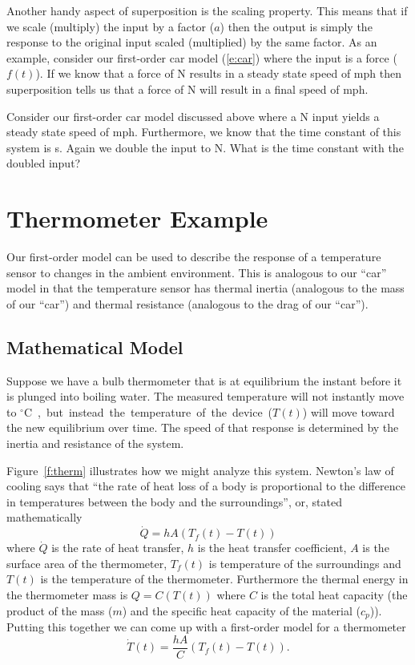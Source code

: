 Another handy aspect of superposition is the scaling property.  This means that if we scale (multiply) the input by a factor ($a$) then the output is simply the response to the original input scaled (multiplied) by the same factor.  As an example, consider our first-order car model (\ref{e:car}) where the input is a force ($f(t)$).  If we know that a force of \unit[1,000]{N} results in a steady state speed of \unit[25]{mph} then superposition tells us that a force of \unit[2,000]{N} will result in a final speed of \unit[50]{mph}.

\begin{ex}
Consider our first-order car model discussed above where a \unit[1,000]{N} input yields a steady state speed of \unit[25]{mph}.  Furthermore, we know that the time constant of this system is \unit[2]{s}.  Again we double the input to \unit[2,000]{N}. What is the time constant with the doubled input?
\end{ex}

\section{Thermometer Example}
Our first-order model can be used to describe the response of a temperature sensor to changes in the ambient environment.  This is analogous to our ``car'' model in that the temperature sensor has thermal inertia (analogous to the mass of our ``car'') and thermal resistance (analogous to the drag of our ``car'').  

\subsection{Mathematical Model}
Suppose we have a bulb thermometer that is at equilibrium the instant before it is plunged into boiling water.  The measured temperature will not instantly move to \unit[100]{$^{\circ}$C}, but instead the temperature of the device ($T(t)$) will move toward the new equilibrium over time.  The speed of that response is determined by the inertia and resistance of the system.

Figure~\ref{f:therm} illustrates how we might analyze this system.  Newton's law of cooling says that ``the rate of heat loss of a body is proportional to the difference in temperatures between the body and the surroundings'', or, stated mathematically 
\begin{equation}
\dot{Q}=hA (T_f(t)-T(t))
\end{equation}
where $\dot{Q}$ is the rate of heat transfer, $h$ is the heat transfer coefficient, $A$ is the surface area of the thermometer, $T_f(t)$ is temperature of the surroundings and $T(t)$ is the temperature of the thermometer.  Furthermore the thermal energy in the thermometer mass is $Q=C(T(t))$ where $C$ is the total heat capacity (the product of the mass ($m$) and the specific heat capacity of the material ($c_p$)).  Putting this together we can come up with a first-order model for a thermometer
\begin{equation}
\label{e:therm}
\dot{T}(t)= \frac{hA}{C}(T_f(t)-T(t)).
\end{equation}

